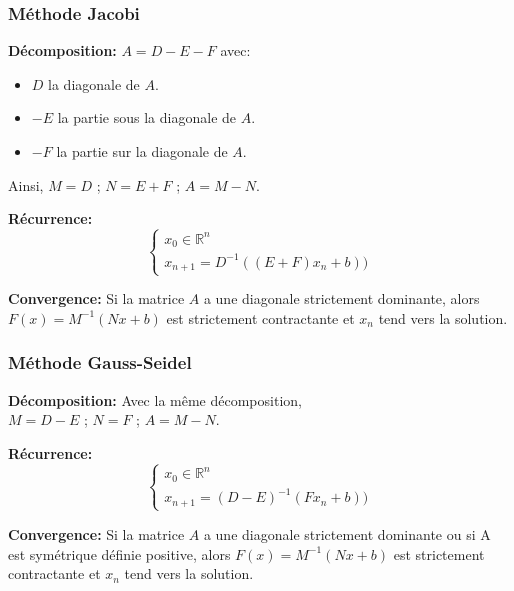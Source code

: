 \documentclass[10pt,a4paper,french]{article}
\newenvironment{decompo}{\par\medskip\noindent \textbf{Décomposition:}}{\medskip}
\newenvironment{reccu}{\par\medskip\noindent\textbf{Récurrence:}}{\medskip}
\newenvironment{conv}{\par\medskip\noindent\textbf{Convergence:}}{\medskip}
\begin{document}
\subsubsection{Méthode Jacobi}
\begin{decompo}
$A=D-E-F$ avec:
\begin{itemize}
\item $D$ la diagonale de $A$.
\item $-E$ la partie sous la diagonale de $A$.
\item $-F$ la partie sur la diagonale de $A$.
\end{itemize}
Ainsi, $M=D$ ; $N=E+F$ ; $A=M-N$.
\end{decompo}

\begin{reccu}
$$
\left\{
	\begin{array}{ll}
		x_0 \in \mathbb{R}^n \\
		x_{n+1}=D^{-1}((E+F)x_n+b))
	\end{array}
\right.
$$

\end{reccu}

\begin{conv}
Si la matrice $A$ a une diagonale strictement dominante, alors $F(x)=M^{-1}(Nx+b)$ est strictement contractante et $x_n$ tend vers la solution. 
\end{conv}

\subsubsection{Méthode Gauss-Seidel}
\begin{decompo}
Avec la même décomposition,\\
$M=D-E$ ; $N=F$ ; $A=M-N$.
\end{decompo}

\begin{reccu}
$$
\left\{
	\begin{array}{ll}
		x_0 \in \mathbb{R}^n \\
		x_{n+1}=(D-E)^{-1}(Fx_n+b))
	\end{array}
\right.
$$

\end{reccu}

\begin{conv}
Si la matrice $A$ a une diagonale strictement dominante ou si A est symétrique définie positive, alors $F(x)=M^{-1}(Nx+b)$ est strictement contractante et $x_n$ tend vers la solution.  
\end{conv}
\end{document}
